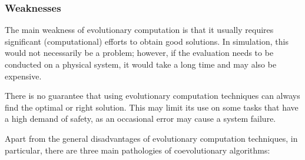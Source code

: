\subsubsection{Weaknesses}

The main weakness of evolutionary computation is that it usually requires significant (computational) efforts to obtain good solutions. In simulation, this would not necessarily be a problem; however, if the evaluation needs to be conducted on a physical system, it would take a long time and may also be expensive.

There is no guarantee that using evolutionary computation techniques can always find the optimal or right solution. This may limit its use on some tasks that have a high demand of safety, as an occasional error may cause a system failure.

Apart from the general disadvantages of evolutionary computation techniques, in particular, there are three main pathologies of coevolutionary algorithms:

